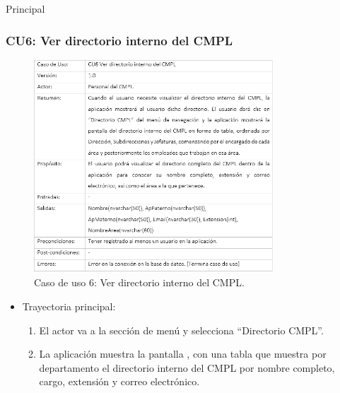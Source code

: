 \begin{UCtrayectoria}{Principal}
\newpage
			
		\subsubsection{CU6: Ver directorio interno del CMPL}
			\begin{figure}[htbp!]
				\centering
					\includegraphics[width=0.8\textwidth]{images/CU/CU6}
					\caption{Caso de uso 6: Ver directorio interno del CMPL.}
				\label{Tabla}
			\end{figure}
			
			\begin{itemize}
				\item Trayectoria principal:
					\begin{enumerate}
						\item El actor va a la sección de menú y selecciona ``Directorio CMPL''.
						\item La aplicación muestra la pantalla , con una tabla que muestra por departamento el directorio interno del CMPL por nombre completo, cargo, extensión y correo electrónico.
					\end{enumerate}
			\end{itemize}
			
\newpage
			

\end{UCtrayectoria}

